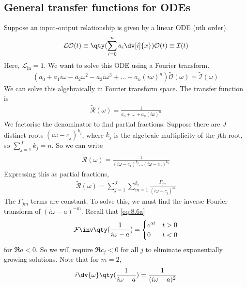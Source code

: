 \subsection{General transfer functions for ODEs}
Suppose an input-output relationship is given by a linear ODE (nth order).
\begin{align} \label{eq:8.31}
	\mathcal L \mathcal O(t) \equiv \qty(\sum_{i=0}^n a_i \dv[i]{x}) \mathcal O(t) \equiv \mathcal I(t)
\end{align}
Here, $\mathcal L_{\text{in}} = 1$.
We want to solve this ODE using a Fourier transform.
\begin{align*}
	(a_0 + a_1 i\omega - a_2 \omega^2 - a_3 i\omega^3 + \dots + a_n (i \omega)^n) \widetilde{\mathcal O}(\omega) = \widetilde{\mathcal I}(\omega)
\end{align*}
We can solve this algebraically in Fourier transform space.
The transfer function is
\begin{align} \label{eq:8.32}
	\widetilde{\mathcal R}(\omega) = \frac{1}{a_0 + \dots + a_n (i \omega)^n}
\end{align}
We factorise the denominator to find partial fractions.
Suppose there are $J$ distinct roots $(i \omega - c_j)^{k_j}$, where $k_j$ is the algebraic multiplicity of the $j$th root, so $\sum_{j=1}^J k_j = n$.
So we can write
\begin{align*}
	\widetilde{\mathcal R}(\omega) = \frac{1}{(i \omega - c_1)^{k_1} \dots (i \omega - c_J)^{k_J}}
\end{align*}
Expressing this as partial fractions,
\begin{align} \label{eq:8.33}
	\widetilde{\mathcal R}(\omega) = \sum_{j=1}^J \sum_{m=1}^{k_i} \frac{\Gamma_{jm}}{(i\omega - c_j)^m}
\end{align}
The $\Gamma_{jm}$ terms are constant.
To solve this, we must find the inverse Fourier transform of $(i\omega - a)^{-m}$.
Recall that \cref{eq:8.6a}
\begin{align*}
	\mathcal F\inv\qty(\frac{1}{i\omega - a}) = \begin{cases}
		e^{at} & t > 0 \\
		0      & t < 0
	\end{cases}
\end{align*}
for $\Re a < 0$.
So we will require $\Re c_j < 0$ for all $j$ to eliminate exponentially growing solutions.
Note that for $m = 2$,
\begin{align*}
	i \dv{\omega} \qty(\frac{1}{i \omega - a}) = \frac{1}{(i \omega - a)^2}
\end{align*}
